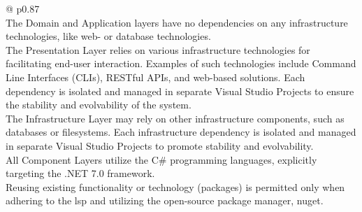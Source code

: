 \begin{table}[H]
    \begin{tabular}{@{\makebox[2em][c]{\rownumber\space}}  p{0.87\linewidth}}
        \\ 
    \hline
       The Domain and Application layers have no dependencies on any infrastructure technologies, like web- or database
       technologies. 
       \\
       The Presentation Layer relies on various infrastructure technologies for
       facilitating end-user interaction. Examples of such technologies include Command
       Line Interfaces (CLIs), RESTful APIs, and web-based solutions. Each dependency is
       isolated and managed in separate Visual Studio Projects to ensure the stability and
       evolvability of the system. 
       \\
       The Infrastructure Layer may rely on other infrastructure components, such
       as databases or filesystems. Each infrastructure dependency is isolated and managed
       in separate Visual Studio Projects to promote stability and evolvability. 
       \\
       All Component Layers utilize the C\# programming languages, explicitly targeting
       the .NET 7.0 framework. 
       \\
       Reusing existing functionality or technology (packages) is permitted only when
       adhering to the \gls{lsp} and utilizing the open-source package manager, \gls{nuget}.
        \\
       \hline
    \end{tabular}
\caption{Application Layer Technology Requirements}
\label{table_requirements_application_layer_technology}
\end{table}